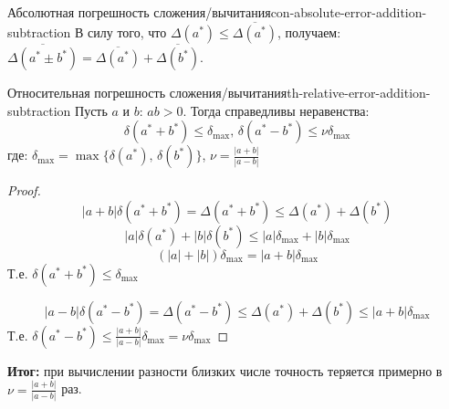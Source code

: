 \documentclass[14pt]{extarticle}
\begin{document}
        \begin{consequence}{Абсолютная погрешность сложения/вычитания}{con-absolute-error-addition-subtraction}
            В силу того, что $\Delta(a^{*}) \leq \overline{\Delta(a^{*})}$, получаем: $\overline{\Delta(a^{*} \pm b^{*})} = \overline{\Delta(a^{*})} + \overline{\Delta(b^{*})}$.
        \end{consequence}

        \begin{theorem}{Относительная погрешность сложения/вычитания}{th-relative-error-addition-subtraction}
            Пусть $a$ и $b$: $ab > 0$. Тогда справедливы неравенства:
            $$\delta(a^{*} + b^{*}) \leq \delta_{\max} \text{, } \delta(a^{*} - b^{*}) \leq \nu \delta_{\max}$$
            где: $\delta_{\max} = \max\{\delta(a^{*}) \text{, } \delta(b^{*})\}$, $\nu = \frac{|a + b|}{|a - b|}$
        
            \begin{proof}
                $$|a + b|\delta(a^{*} + b^{*}) = \Delta(a^{*} + b^{*}) \leq \Delta(a^{*}) + \Delta(b^{*})$$ 
                $$|a|\delta(a^{*}) + |b|\delta(b^{*}) \leq |a|\delta_{\max} + |b|\delta_{\max} $$ 
                $$(|a| + |b|)\delta_{\max} = |a + b|\delta_{\max}$$
                Т.е. $\delta(a^{*} + b^{*}) \leq \delta_{\max}$

                \vspace{\baselineskip}

                $$|a - b|\delta(a^{*} - b^{*}) = \Delta(a^{*} - b^{*}) \leq \Delta(a^{*}) + \Delta(b^{*}) \leq |a + b| \delta_{\max}$$
                Т.е. $\delta(a^{*} - b^{*}) \leq \frac{|a + b|}{|a -b|}\delta_{\max} = \nu \delta_{\max}$
            \end{proof}
        \end{theorem}

        \textbf{Итог:} при вычислении разности близких числе точность теряется примерно в $\nu = \frac{|a+b|}{|a-b|}$ раз.
\end{document}
